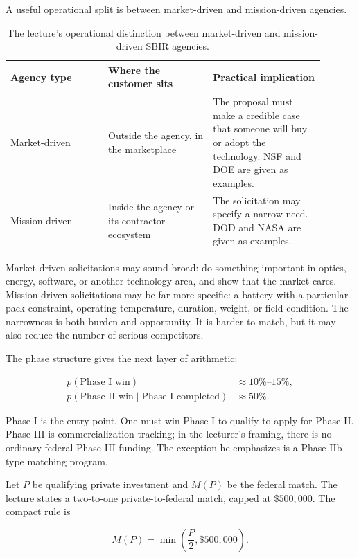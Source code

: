 A useful operational split is between market-driven and mission-driven agencies.

\begin{table}
\centering
\begin{tabular}{p{0.28\linewidth}p{0.30\linewidth}p{0.32\linewidth}}
\hline
Agency type & Where the customer sits & Practical implication\\
\hline
Market-driven & Outside the agency, in the marketplace & The proposal must make a credible case that someone will buy or adopt the technology. NSF and DOE are given as examples.\\
Mission-driven & Inside the agency or its contractor ecosystem & The solicitation may specify a narrow need. DOD and NASA are given as examples.\\
\hline
\end{tabular}
\caption{The lecture's operational distinction between market-driven and mission-driven SBIR agencies.}
\end{table}

Market-driven solicitations may sound broad: do something important in optics, energy, software, or another technology area, and show that the market cares. Mission-driven solicitations may be far more specific: a battery with a particular pack constraint, operating temperature, duration, weight, or field condition. The narrowness is both burden and opportunity. It is harder to match, but it may also reduce the number of serious competitors.

The phase structure gives the next layer of arithmetic:

\begin{align}
p(\text{Phase I win}) &\approx 10\%\text{--}15\%,\\
p(\text{Phase II win}\mid \text{Phase I completed}) &\approx 50\%.
\end{align}

Phase I is the entry point. One must win Phase I to qualify to apply for Phase II. Phase III is commercialization tracking; in the lecturer's framing, there is no ordinary federal Phase III funding. The exception he emphasizes is a Phase IIb-type matching program.

Let \(P\) be qualifying private investment and \(M(P)\) be the federal match. The lecture states a two-to-one private-to-federal match, capped at \(\$500{,}000\). The compact rule is

\begin{equation}
M(P)=\min\left(\frac{P}{2},\$500{,}000\right).
\end{equation}

